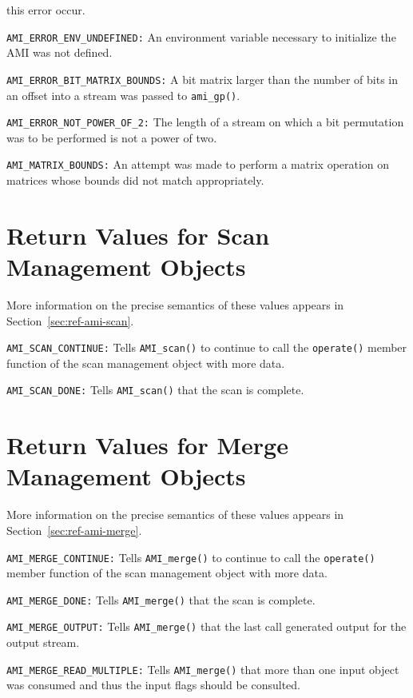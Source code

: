\begin{description}
  this error occur. 
\item\lstinline|AMI_ERROR_ENV_UNDEFINED:|
  An environment variable necessary to initialize the AMI was not defined.
\item\lstinline|AMI_ERROR_BIT_MATRIX_BOUNDS:|
  A bit matrix larger than the number of bits in an offset into a
  stream was passed to \lstinline|ami_gp()|.
\item\lstinline|AMI_ERROR_NOT_POWER_OF_2:|
  The length of a stream on which a bit permutation was to be
  performed is not a power of two.
\item\lstinline|AMI_MATRIX_BOUNDS:| An attempt was made to perform a
  matrix operation on matrices whose bounds did not match appropriately.
\end{description}


\section{Return Values for Scan Management Objects}

More information on the precise semantics of these values appears in
Section~\ref{sec:ref-ami-scan}.
\begin{description}
\item\lstinline|AMI_SCAN_CONTINUE:|  Tells \lstinline|AMI_scan()| to continue
  to call the \lstinline|operate()| member function of the scan management
  object with more data.
\item\lstinline|AMI_SCAN_DONE:|  Tells \lstinline|AMI_scan()| that the scan is
  complete. 
\end{description}

\section{Return Values for Merge Management Objects}

More information on the precise semantics of these values appears in
Section~\ref{sec:ref-ami-merge}.
\begin{description}
\item\lstinline|AMI_MERGE_CONTINUE:| Tells
\lstinline|AMI_merge()| to continue
  to call the \lstinline|operate()| member function of the scan management
  object with more data.
\item\lstinline|AMI_MERGE_DONE:| Tells \lstinline|AMI_merge()| that the scan is
  complete. 
\item\lstinline|AMI_MERGE_OUTPUT:|  Tells \lstinline|AMI_merge()| that the
  last call generated output for the output stream.
\item\lstinline|AMI_MERGE_READ_MULTIPLE:|  Tells \lstinline|AMI_merge()| that
  more than one input object was consumed and thus the input flags
  should be consulted.
\end{description}


